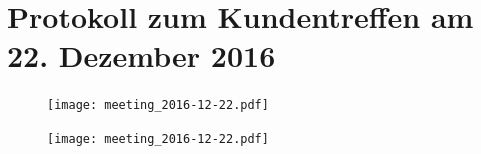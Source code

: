 \documentclass[12pt]{scrartcl}
\newcommand{\textMeetingSecond}{Protokoll zum Kundentreffen am 22. Dezember 2016}
\begin{document}
	\clearpage
	\section{\textMeetingSecond}
	\label{\textMeetingSecond}
	\begin{figure}[h!]
		\centering
		\texttt{[image: meeting\_2016-12-22.pdf]}
	\end{figure}  	
	
	\begin{figure}[h!]
		\centering
		\texttt{[image: meeting\_2016-12-22.pdf]}
	\end{figure}  	
	
	\clearpage
	\listoffigures
	
	\clearpage
	\printbibliography[heading=bibintoc]
\end{document}
